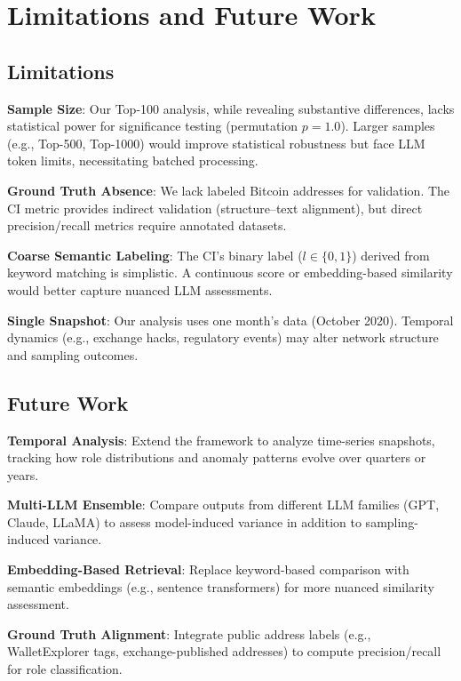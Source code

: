 \section{Limitations and Future Work}\label{sec:limitations}

\subsection{Limitations}

\textbf{Sample Size}: Our Top-100 analysis, while revealing substantive differences, lacks statistical power for significance testing (permutation $p{=}1.0$). Larger samples (e.g., Top-500, Top-1000) would improve statistical robustness but face LLM token limits, necessitating batched processing.

\textbf{Ground Truth Absence}: We lack labeled Bitcoin addresses for validation. The CI metric provides indirect validation (structure--text alignment), but direct precision/recall metrics require annotated datasets.

\textbf{Coarse Semantic Labeling}: The CI's binary label ($l \in \{0,1\}$) derived from keyword matching is simplistic. A continuous score or embedding-based similarity would better capture nuanced LLM assessments.

\textbf{Single Snapshot}: Our analysis uses one month's data (October 2020). Temporal dynamics (e.g., exchange hacks, regulatory events) may alter network structure and sampling outcomes.

\subsection{Future Work}

\textbf{Temporal Analysis}: Extend the framework to analyze time-series snapshots, tracking how role distributions and anomaly patterns evolve over quarters or years.

\textbf{Multi-LLM Ensemble}: Compare outputs from different LLM families (GPT, Claude, LLaMA) to assess model-induced variance in addition to sampling-induced variance.

\textbf{Embedding-Based Retrieval}: Replace keyword-based comparison with semantic embeddings (e.g., sentence transformers) for more nuanced similarity assessment.

\textbf{Ground Truth Alignment}: Integrate public address labels (e.g., WalletExplorer tags, exchange-published addresses) to compute precision/recall for role classification.

